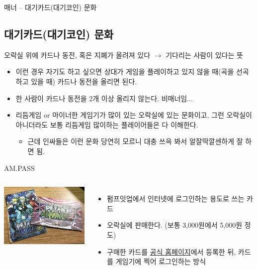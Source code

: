 \documentclass{beamer}
\begin{document}
\begin{frame}{매너 -- 대기카드(대기코인) 문화}
	\subsection{대기카드(대기코인) 문화}
	
	오락실 위에 카드나 동전, 혹은 지폐가 올려져 있다 $ \rightarrow $ 기다리는 사람이 있다는 뜻
	\begin{itemize}
		\item 이런 경우 자기도 하고 싶으면 상대가 게임을 플레이하고 있지 않을 때(곡을 선곡하고 있을 때) 카드나 동전을 올리면 된다.
		\item 한 사람이 카드나 동전을 2개 이상 올리지 않는다. 비매너임...
		\item 리듬게임 or 마이너한 게임기가 많이 있는 오락실에 있는 문화이고, 그런 오락실이 아니더라도 보통 리듬게임 많이하는 플레이어들은 다 이해한다.
		\begin{itemize}
			\item 근데 인싸들은 이런 문화 당연히 모르니 대충 쓰윽 봐서 알잘딱깔센하게 잘 하면 됨.
		\end{itemize}
	\end{itemize}
\end{frame}

\begin{frame}{AM.PASS}
	\begin{columns}
		\includegraphics[width=\columnwidth]{am-pass.jpg}

		\begin{itemize}
			\item 펌프잇업에서 인터넷에 로그인하는 용도로 쓰는 카드
			\item 오락실에 판매한다. (보통 3,000원에서 5,000원 정도)
			\item 구매한 카드를 \href{https://piugame.com}{공식 홈페이지}에서 등록한 뒤, 카드를 게임기에 찍어 로그인하는 방식
		\end{itemize}
	\end{columns}
\end{frame}
\end{document}
